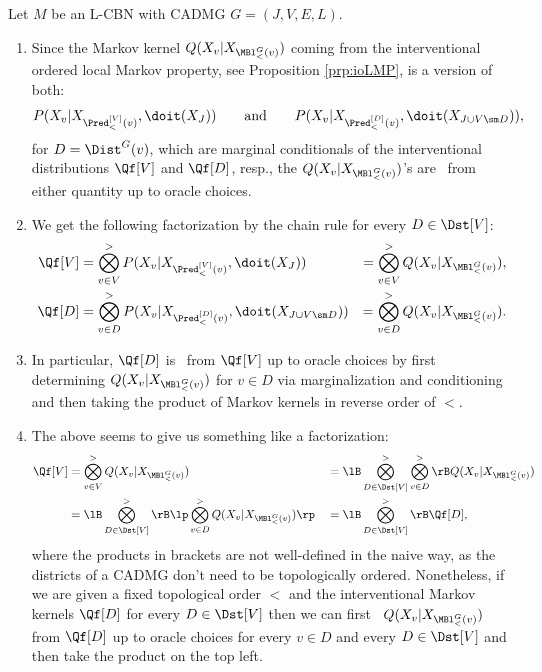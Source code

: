 \begin{Rem} 
    \label{rem:Q-dist-ident}
    Let $M$ be an L-CBN with \observational CADMG $G=(J,V,E,L)$.
    \begin{enumerate}
        \item Since the Markov kernel $Q(X_v|X_{\MBl^G_<(v)})$ coming from the interventional ordered local Markov property, 
            see Proposition \ref{prp:ioLMP}, is a version of both:
          \[ P(X_v|X_{\Pred^{[V]}_<(v)},\doit(X_J)) \qquad \text{and} \qquad P(X_v|X_{\Pred^{[D]}_<(v)},\doit(X_{J \cup V\sm D})),\]
                for $D=\Dist^G(v)$, which are marginal conditionals of the interventional distributions $\Qf[V]$ and $\Qf[D]$, resp.,
                the $Q(X_v|X_{\MBl^G_<(v)})$'s are \trackable\ from either quantity up to oracle choices.
            \item We get the following factorization by the chain rule for every $D \in \Dst[V]$: %
               \begin{align*}
                   \Qf[V] &= \bigotimes_{v \in V}^> P(X_v|X_{\Pred^{[V]}_<(v)},\doit(X_J)) &= \bigotimes_{v \in V}^> Q(X_v|X_{\MBl^G_<(v)}), \\
                   \Qf[D] &= \bigotimes_{v \in D}^> P(X_v|X_{\Pred^{[D]}_<(v)},\doit(X_{J \cup V\sm D})) &= \bigotimes_{v \in D}^> Q(X_v|X_{\MBl^G_<(v)}).
               \end{align*}
           \item In particular, $\Qf[D]$ is \trackable\ from $\Qf[V]$ up to oracle choices 
               by first determining $Q(X_v|X_{\MBl^G_<(v)})$ for $v \in D$  
               via marginalization and conditioning and then taking the product of Markov kernels in reverse order of $<$.
            \item The above seems to give us something like a factorization:
       \begin{align*}
           \Qf[V] &= \bigotimes_{v \in V}^> Q(X_v|X_{\MBl^G_<(v)}) 
            && = \lB \bigotimes_{D \in \Dst[V]}^> \bigotimes_{v \in D}^>  \rB Q(X_v|X_{\MBl^G_<(v)}) \\
            & = \lB \bigotimes_{D \in \Dst[V]}^> \rB \lp \bigotimes_{v \in D}^>  Q(X_v|X_{\MBl^G_<(v)}) \rp  
            && = \lB \bigotimes_{D \in \Dst[V]}^>\rB \Qf[D],             
       \end{align*}
         where the products in brackets are not well-defined in the naive way, 
         as the districts of a CADMG don't need to be topologically ordered.
         Nonetheless, if we are given a fixed topological order $<$ and the interventional Markov kernels $\Qf[D]$ 
         for every $D \in \Dst[V]$ 
         then we can first \track\ $Q(X_v|X_{\MBl^G_<(v)})$ from $\Qf[D]$ up to oracle choices
         for every $v \in D$ and every $D \in \Dst[V]$ and then take the product
         on the top left. 
    \end{enumerate}
\end{Rem}

